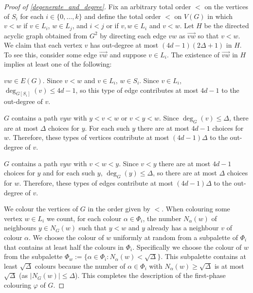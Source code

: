 \documentclass[kpfonts]{patmorin}
\begin{document}
\begin{proof}[Proof of \cref{degenerate_and_degree}]
  Fix an arbitrary total order $<$ on the vertices of $S_i$ for each $i\in\{0,\ldots,k\}$ and define the total order $<$ on $V(G)$ in which $v <w$ if $v\in L_i$, $w\in L_j$, and $i<j$ or if $v,w\in L_i$ and $v<w$.  Let $H$ be the directed acyclic graph obtained from $G^2$ by directing each edge $vw$ as $\overrightarrow{vw}$ so that $v<w$.  We claim that each vertex $v$ has out-degree at most $(4d-1)(2\Delta+1)$ in $H$.  To see this, consider some edge $\overrightarrow{vw}$ and suppose $v\in L_i$.  The existence of $\overrightarrow{vw}$ in $H$ implies at least one of the following:
  \begin{compactenum}
    \item $vw\in E(G)$.  Since $v<w$ and $v\in L_i$, $w\in S_i$.  Since $v\in L_i$, $\deg_{G[S_i]}(v)\le 4d-1$, so this type of edge contributes at most $4d-1$ to the out-degree of $v$.
    \item $G$ contains a path $vyw$ with $y < v < w$ or $v < y < w$.  Since $\deg_G(v)\le\Delta$, there are at most $\Delta$ choices for $y$.  For each such $y$ there are at most $4d-1$ choices for $w$.  Therefore, these types of vertices contribute at most $(4d-1)\Delta$ to the out-degree of $v$.
    \item $G$ contains a path $vyw$ with $v < w < y$.  Since $v<y$ there are at most $4d-1$ choices for $y$ and for each such $y$, $\deg_G(y)\le\Delta$, so there are at most $\Delta$ choices for $w$.  Therefore, these types of edges contribute at most $(4d-1)\Delta$ to the out-degree of $v$.
  \end{compactenum}
  We colour the vertices of $G$ in the order given by $<$.  When colouring some vertex $w\in L_i$ we count, for each colour $\alpha\in \Phi_i$, the number $N_\alpha(w)$ of neighbours $y\in N_G(w)$ such that $y < w$ and $y$ already has a neighbour $v$ of colour $\alpha$.  We choose the colour of $w$ uniformly at random from a subpalette of $\Phi_i$ that contains at least half the colours in $\Phi_i$.  Specifically we choose the colour of $w$ from the subpalette $\Phi_w:=\{\alpha\in\Phi_i: N_{\alpha}(w)<\sqrt{\Delta}\}$.  This subpalette contains at least $\sqrt{\Delta}$ colours because the number of $\alpha\in\Phi_i$ with $N_\alpha(w)\ge \sqrt{\Delta}$ is at most $\sqrt{\Delta}$ (as $|N_G(w)|\leq \Delta$).
  This completes the description of the first-phase colouring $\varphi$ of $G$.


\end{proof}
\end{document}
